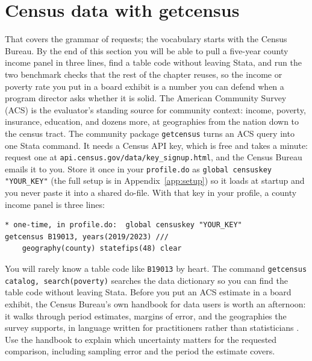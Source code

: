 \documentclass[
    a4paper,
    fontsize=10pt,
    twoside=true,
    numbers=noenddot,
]{kaobook}
\begin{document}
\section{Census data with getcensus}
That covers the grammar of requests; the vocabulary starts with the Census Bureau. By the end of this section you will be able to pull a five-year county income panel in three lines, find a table code without leaving Stata, and run the two benchmark checks that the rest of the chapter reuses, so the income or poverty rate you put in a board exhibit is a number you can defend when a program director asks whether it is solid. The American Community Survey (ACS) is the evaluator's standing source for community context: income, poverty, insurance, education, and dozens more, at geographies from the nation down to the census tract. The community package \texttt{getcensus} turns an ACS query into one Stata command. It needs a Census API key, which is free and takes a minute: request one at \texttt{api.census.gov/data/key\_signup.html}, and the Census Bureau emails it to you. Store it once in your \texttt{profile.do} as \texttt{global censuskey "YOUR\_KEY"} (the full setup is in Appendix~\ref{app:setup}) so it loads at startup and you never paste it into a shared do-file. With that key in your profile, a county income panel is three lines:
\par
{\footnotesize
\begin{verbatim}
* one-time, in profile.do:  global censuskey "YOUR_KEY"
getcensus B19013, years(2019/2023) ///
    geography(county) statefips(48) clear
\end{verbatim}
}
You will rarely know a table code like \texttt{B19013} by heart. The command \texttt{getcensus catalog, search(poverty)} searches the data dictionary so you can find the table code without leaving Stata. Before you put an ACS estimate in a board exhibit, the Census Bureau's own handbook for data users is worth an afternoon: it walks through period estimates, margins of error, and the geographies the survey supports, in language written for practitioners rather than statisticians \parencite{census2020acs}. Use the handbook to explain which uncertainty matters for the requested comparison, including sampling error and the period the estimate covers.
\end{document}
